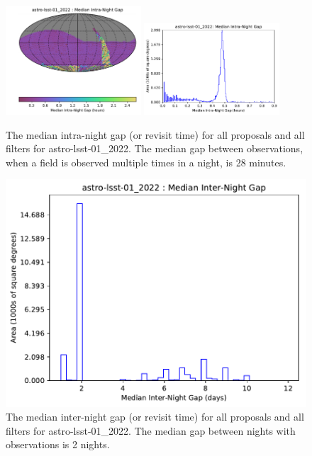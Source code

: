 \documentclass[DM,lsstdraft,authoryear,toc]{lsstdoc}
\begin{document}
\begin{figure}[t!]
\vskip -0.0in
\includegraphics[width=0.45\textwidth]{figures/astro-lsst-01_2022_Median_Intra-Night_Gap_HEAL_SkyMap.pdf}
\includegraphics[width=0.45\textwidth]{figures/astro-lsst-01_2022-median_intra_night_gap_hist.pdf}
\vskip -0.1in
\caption{The median intra-night gap (or revisit time) for all proposals and all filters for astro-lsst-01\_2022.
The median gap between observations, when a field is observed multiple times in a night, is 28 minutes.
\label{fig:baseline_InterGapAll}}
\end{figure}

\begin{figure}[t!]
\vskip -0.0in
\includegraphics[width=0.45\textwidth{figures/astro-lsst-01_2022_Median_Inter-Night_Gap_HEAL_SkyMap.pdf}
\includegraphics[width=0.45\textwidth]{figures/astro-lsst-01_2022_Median_Inter-Night_Gap_HEAL_Histogram.pdf}
\vskip -0.1in
\caption{The median inter-night gap (or revisit time)  for all proposals and all filters for astro-lsst-01\_2022.
The median gap between nights with observations is 2 nights.
\label{fig:baseline_GapAll}}
\end{figure}
\end{document}
